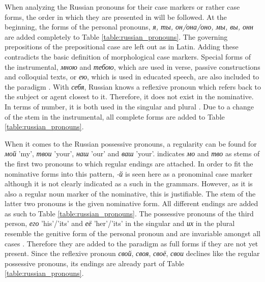 \documentclass[11pt,a4paper,twoside,openright]{scrbook}
\begin{document}
When analyzing the Russian pronouns for their case markers or rather case forms, the order in which they are presented in \citet{wade2020russ} will be followed. At the beginning, the forms of the personal pronouns, \foreignlanguage{russian}{\textit{я, ты, он/она/оно, мы, вы, онн}} are added completely to Table \ref{table:russian_pronouns}. The governing prepositions of the prepositional case are left out as in Latin. Adding these contradicts the basic definition of morphological case markers.
Special forms of the instrumental, \foreignlanguage{russian}{\textit{мною} and \textit{тебою}}, which are used in verse, passive constructions and colloquial texts, or \foreignlanguage{russian}{\textit{ею}}, which is used in educated speech, are also included to the paradigm \citep{wade2020russ}. 
With \foreignlanguage{russian}{\textit{себя}}, Russian knows a reflexive pronoun which refers back to the subject or agent closest to it. Therefore, it does not exist in the nominative. In terms of number, it is both used in the singular and plural \citep{kohls2009russ}. Due to a change of the stem in the instrumental, all complete forms are added to Table \ref{table:russian_pronouns}.

When it comes to the Russian possessive pronouns, a regularity can be found for \foreignlanguage{russian}{\textit{мой}} 'my', \foreignlanguage{russian}{\textit{твои}} 'your',  \foreignlanguage{russian}{\textit{наш}} 'our' and \foreignlanguage{russian}{\textit{ваш}} 'your'. \citet{wade2020russ} indicates \foreignlanguage{russian}{\textit{мо}} and \foreignlanguage{russian}{\textit{тво}} as stems of the first two pronouns to which regular endings are attached. In order to fit the nominative forms into this pattern, \foreignlanguage{russian}{\textit{-й}} is seen here as a pronominal case marker although it is not clearly indicated as a such in the grammars. However, as it is also a regular noun marker of the nominative, this is justifiable. The stem of the latter two pronouns is the given nominative form. All different endings are added as such to Table \ref{table:russian_pronouns}. The possessive pronouns of the third person, \foreignlanguage{russian}{\textit{его}} 'his'/'its' and  \foreignlanguage{russian}{\textit{её}} 'her'/'its' in the singular and \foreignlanguage{russian}{\textit{их}} in the plural resemble the genitive form of the personal pronoun and are invariable amongst all cases \citep{kohls2009russ}. Therefore they are added to the paradigm as full forms if they are not yet present. Since the reflexive pronoun \foreignlanguage{russian}{\textit{свой}, \textit{своя}, \textit{своё}, \textit{свои}} declines like the regular possessive pronouns, its endings are already part of Table \ref{table:russian_pronouns}.
\end{document}
